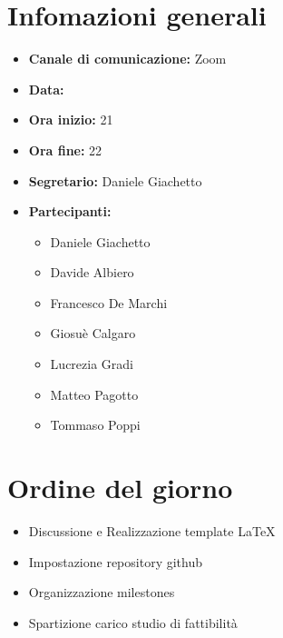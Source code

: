 \section{Infomazioni generali}

\begin{itemize}

	\item \textbf{Canale di comunicazione:} Zoom
	
	\item \textbf{Data:} \DataMeeting{}
	
	\item \textbf{Ora inizio:} 21
	
	\item \textbf{Ora fine:} 22
	
	\item \textbf{Segretario:} Daniele Giachetto
	
	\item \textbf{Partecipanti:}
	
		\begin{itemize}
		
			\item Daniele Giachetto
			\item Davide Albiero
			\item Francesco De Marchi
			\item Giosuè Calgaro
			\item Lucrezia Gradi
			\item Matteo Pagotto
			\item Tommaso Poppi
				 
		\end{itemize}

\end{itemize}

\section{Ordine del giorno}

\begin{itemize}

	\item Discussione e Realizzazione template \LaTeX

	\item Impostazione repository github

	\item Organizzazione milestones

	\item Spartizione carico studio di fattibilità

\end{itemize}

